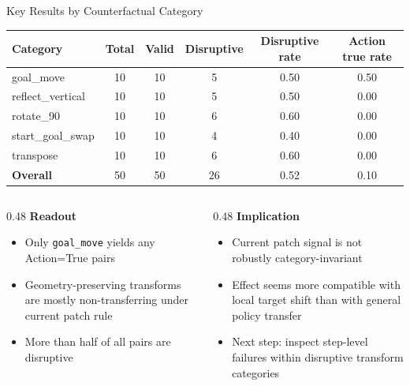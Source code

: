 \documentclass[aspectratio=169]{beamer}
\newcommand{\good}[1]{\textcolor{green!50!black}{#1}}
\newcommand{\bad}[1]{\textcolor{red!70!black}{#1}}
\newcommand{\neutral}[1]{\textcolor{blue!60!black}{#1}}
\begin{document}
\begin{frame}{Key Results by Counterfactual Category}
\centering
\small
\begin{tabular}{lccccc}
\toprule
\textbf{Category} & \textbf{Total} & \textbf{Valid} & \textbf{Disruptive} & \textbf{Disruptive rate} & \textbf{Action true rate} \\
\midrule
goal\_move         & 10 & 10 & 5 & 0.50 & \good{0.50} \\
reflect\_vertical  & 10 & 10 & 5 & 0.50 & \bad{0.00} \\
rotate\_90         & 10 & 10 & 6 & 0.60 & \bad{0.00} \\
start\_goal\_swap  & 10 & 10 & 4 & 0.40 & \bad{0.00} \\
transpose          & 10 & 10 & 6 & 0.60 & \bad{0.00} \\
\midrule
\textbf{Overall}   & 50 & 50 & 26 & 0.52 & \neutral{0.10} \\
\bottomrule
\end{tabular}

\vspace{0.7em}
\begin{columns}[T]
\begin{column}{0.48\textwidth}
\textbf{Readout}
\begin{itemize}
  \item Only \texttt{goal\_move} yields any Action=True pairs
  \item Geometry-preserving transforms are mostly non-transferring under current patch rule
  \item More than half of all pairs are disruptive
\end{itemize}
\end{column}
\begin{column}{0.48\textwidth}
\textbf{Implication}
\begin{itemize}
  \item Current patch signal is not robustly category-invariant
  \item Effect seems more compatible with local target shift than with general policy transfer
  \item Next step: inspect step-level failures within disruptive transform categories
\end{itemize}
\end{column}
\end{columns}
\end{frame}
\end{document}
